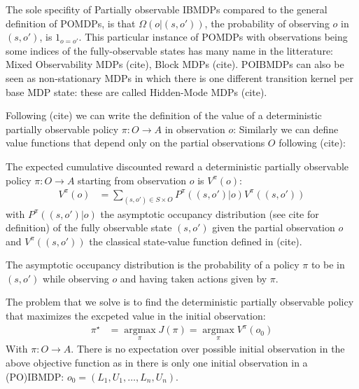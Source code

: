 The sole specifity of Partially observable IBMDPs compared to the general definition of POMDPs, is that $\Omega(o|(s, o'))$, the probability of observing $o$ in $(s,o')$, is $1_{o=o'}$.
This particular instance of POMDPs with observations being some indices of the fully-observable states has many name in the litterature: Mixed Observability MDPs (cite), Block MDPs (cite).
POIBMDPs can also be seen as non-stationary MDPs in which there is one different transition kernel per base MDP state: these are called Hidden-Mode MDPs (cite). 

Following (cite) we can write the definition of the value of a deterministic partially observable policy $\pi:O\rightarrow A$ in observation $o$:
Similarly we can define value functions that depend only on the partial observations $O$ following (cite):

\begin{definition} The expected cumulative discounted reward a deterministic partially observable policy $\pi:O\rightarrow A$ starting from observation $o$ is $V^{\pi}(o)$:
    \begin{align*}
        V^{\pi}(o) &= \underset{(s,o')\in S\times O}{\sum}P^{\pi}((s, o')|o)V^{\pi}((s, o'))
    \end{align*}
with $P^{\pi}((s, o')|o)$ the asymptotic occupancy distribution (see cite for definition) of the fully observable state $(s,o')$ given the partial observation $o$ and $V^{\pi}((s, o'))$ the classical state-value function defined in (cite).
\end{definition}


The asymptotic occupancy distribution is the probability of a policy $\pi$ to be in $(s,o')$ while observing $o$ and having taken actions given by $\pi$.  

The problem that we solve is to find the deterministic partially observable policy that maximizes the excpeted value in the initial observation:
\begin{align}
    \pi^{\star} &= \underset{\pi}{\operatorname{argmax}}J(\pi) = \underset{\pi}{\operatorname{argmax}}V^{\pi}(o_0)
\end{align}
With $\pi:O\rightarrow A$. There is no expectation over possible initial observation in the above objective function as in there is only one initial observation in a (PO)IBMDP: $o_0=(L_1, U_1, \dots, L_n, U_n)$.

